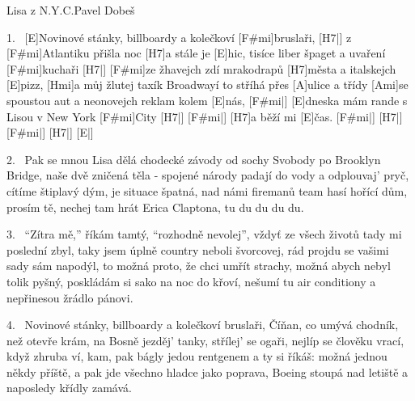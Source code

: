 \begin{song}{Lisa z N.Y.C.}{Pavel Dobeš}

\begin{xverse}{1.~}
[E]Novinové stánky, billboardy a kolečkoví [F#mi]bruslaři, [H7|]{}
z [F#mi]Atlantiku přišla noc [H7]a stále je [E]hic,
tisíce liber špaget a uvaření [F#mi]kuchaři [H7|]{}
[F#mi]ze žhavejch zdí mrakodrapů [H7]města a italskejch [E]pizz,
[Hmi]a můj žlutej taxík Broadwayí to stříhá přes [A]ulice a třídy
[Ami]se spoustou aut a neonovejch reklam kolem [E]nás, [F#mi|]{}
[E]dneska mám rande s Lisou v New York [F#mi]City [H7|]{}
[F#mi|]{} [H7]a běží mi [E]{čas}. [F#mi|]{} [H7|]{} [F#mi|]{} [H7|]{} [E|]{}
\end{xverse}

\begin{xverse}{2.~}
Pak se mnou Lisa dělá chodecké závody
od sochy Svobody po Brooklyn Bridge,
naše dvě zničená těla - spojené národy
padají do vody a odplouvaj' pryč,
cítíme štiplavý dým, je situace špatná,
nad námi firemanů team hasí hořící dům,
prosím tě, nechej tam hrát Erica Claptona,
tu du du du du.
\end{xverse}

\begin{xverse}{3.~}
``Zítra mě,'' říkám tamtý, ``rozhodně nevolej'',
vždyť ze všech životů tady mi poslední zbyl,
taky jsem úplně country neboli švorcovej,
rád projdu se vašimi sady sám napodýl,
to možná proto, že chci umřít strachy,
možná abych nebyl tolik pyšný,
poskládám si sako na noc do křoví,
nešumí tu air conditiony
a nepřinesou žrádlo pánovi.
\end{xverse}

\begin{xverse}{4.~}
Novinové stánky, billboardy a kolečkoví bruslaři,
Číňan, co umývá chodník, než otevře krám,
na Bosně jezděj' tanky, střílej' se ogaři,
nejlíp se člověku vrací, když zhruba ví, kam,
pak bágly jedou rentgenem a ty si říkáš:
možná jednou někdy příště,
a pak jde všechno hladce jako poprava,
Boeing stoupá nad letiště
a naposledy křídly zamává.
\end{xverse}

\end{song}


